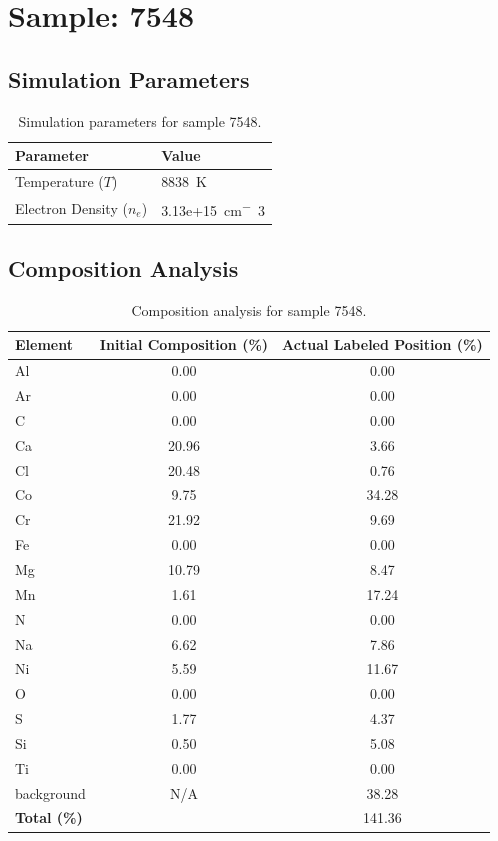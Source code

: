 \documentclass[a4paper,11pt]{article}
\begin{document}
\clearpage

\section{Sample: 7548}
\subsection{Simulation Parameters}
\begin{table}[h!]
    \centering
    \begin{tabular}{ll}
        \toprule
        \textbf{Parameter} & \textbf{Value} \\
        \midrule
        Temperature ($T$) & 8838 \,\si{K} \\
        Electron Density ($n_e$) & 3.13e+15 \,\si{cm^-3} \\
        \bottomrule
    \end{tabular}
    \caption{Simulation parameters for sample 7548.}
    \label{tab:params_7548}
\end{table}

\subsection{Composition Analysis}
\begin{table}[h!]
    \centering
    \begin{tabular}{lcc}
        \toprule
        \textbf{Element} & \textbf{Initial Composition (\%)} & \textbf{Actual Labeled Position (\%)} \\
        \midrule
        Al & 0.00 & 0.00 \\
        Ar & 0.00 & 0.00 \\
        C & 0.00 & 0.00 \\
        Ca & 20.96 & 3.66 \\
        Cl & 20.48 & 0.76 \\
        Co & 9.75 & 34.28 \\
        Cr & 21.92 & 9.69 \\
        Fe & 0.00 & 0.00 \\
        Mg & 10.79 & 8.47 \\
        Mn & 1.61 & 17.24 \\
        N & 0.00 & 0.00 \\
        Na & 6.62 & 7.86 \\
        Ni & 5.59 & 11.67 \\
        O & 0.00 & 0.00 \\
        S & 1.77 & 4.37 \\
        Si & 0.50 & 5.08 \\
        Ti & 0.00 & 0.00 \\
        background & N/A & 38.28 \\

        \midrule
        \textbf{Total (\%)} & & 141.36 \\
        \bottomrule
    \end{tabular}
    \caption{Composition analysis for sample 7548.}
    \label{tab:comp_7548}
\end{table}
\end{document}
